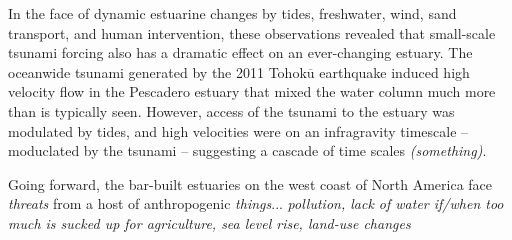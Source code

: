 In the face of dynamic estuarine changes by tides, freshwater, wind, sand transport, and human intervention, these observations revealed that small-scale tsunami forcing also has a dramatic effect on an ever-changing estuary. The oceanwide tsunami generated by the 2011 Tohok$\overline{\mathrm{u}}$ earthquake induced high velocity flow in the Pescadero estuary that mixed the water column much more than is typically seen. However, access of the tsunami to the estuary was modulated by tides, and high velocities were on an infragravity timescale -- moduclated by the tsunami -- suggesting a cascade of time scales \emph{(something)}.

Going forward, the bar-built estuaries on the west coast of North America face \emph{threats} from a host of anthropogenic \emph{things}... \emph{pollution, lack of water if/when too much is sucked up for agriculture, sea level rise, land-use changes}
